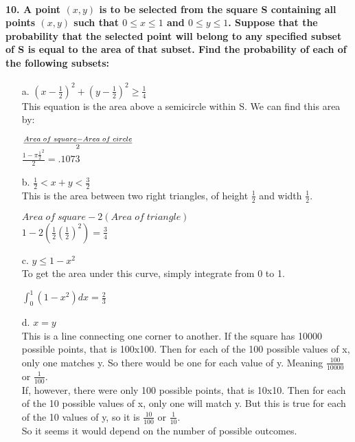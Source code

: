 \documentclass{article}
\begin{document}
\paragraph{10. A point $(x, y)$ is to be selected from the square S containing
all points $(x, y)$ such that $0 \leq x \leq 1$ and $0 \leq y \leq 1$. Suppose 
that the probability that the selected point will belong to any specified subset 
of S is equal to the area of that subset. Find the probability of each of the 
following subsets:}
\begin{enumerate}
\item[a.] $(x-\frac{1}{2})^2 + (y-\frac{1}{2})^2 \geq \frac{1}{4}$\\
This equation is the area above a semicircle within S. We can find this area by:
\begin{center}
$Area\; of\; square - Area\; of\; circle \over 2$\\
$\boxed{\frac{1-\pi\frac{1}{2}^2}{2} = .1073}$
\end{center}

\item[b.] $\frac{1}{2} < x + y < \frac{3}{2}$\\
This is the area between two right triangles, of height $\frac{1}{2}$ and width
$\frac{1}{2}$.
\begin{center}
$Area\; of\; square - 2(Area\; of\; triangle)$\\
$\boxed{1-2\left(\frac{1}{2}\left(\frac{1}{2}\right)^2\right) = \frac{3}{4}}$
\end{center}

\item[c.] $y \leq 1-x^2$\\
To get the area under this curve, simply integrate from 0 to 1.
\begin{center}
$\boxed{\int_0^1(1-x^2)dx = \frac{2}{3}}$
\end{center}

\item[d.] $x=y$\\
This is a line connecting one corner to another. If the square has 10000 possible 
points, that is 100x100. Then for each of the 100 possible values of x, only one 
matches y. So there would be one for each value of y. Meaning 
$\frac{100}{10000}$ or $\frac{1}{100}$.\\
If, however, there were only 100 possible points, that is 10x10. Then for each
of the 10 possible values of x, only one will match y. But this is true for each 
of the 10 values of y, so it is $\frac{10}{100}$ or $\frac{1}{10}$.\\
So it seems it would depend on the number of possible outcomes.\\
\end{enumerate}
\end{document}
